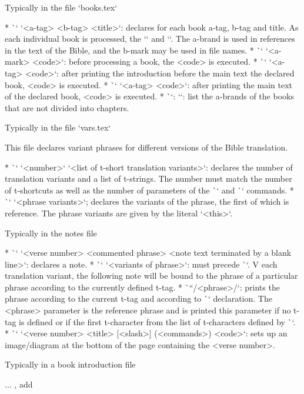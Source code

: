 {{{{{{{\secc Typically in the file `books.tex`

\begitems
* \`\BookTitle` `<a-tag> <b-tag> <title>`: declares for each book
  a-tag, b-tag and title. As each individual book is processed, the
  `\def\amark{<a-mark>}` and `\def\bmark{b-mark}`. The a-brand is used in
  references in the text of the Bible, and the b-mark may be used in file names.
* \`\BookException` `<a-mark> {<code>}`: before processing a book, the
  <code> is executed.
* \`\BookPre` `<a-tag> {<code>}`: after printing the introduction before the main text
  the declared book, <code> is executed.
* \`\BookPost` `<a-tag> {<code>}`: after printing the main text
  of the declared book, <code> is executed.
* \`\nochapbooks`: `\def\nochapbooks{<list>}`: list the a-brands of the books that
  are not divided into chapters.
\enditems

\secc Typically in the file `vars.tex`

This file declares variant phrases for different versions of the Bible translation.

\begitems
* \`\variants` `<number>` `<list of t-short translation variants>`: declares the number of
  translation variants and a list of \hbox{t-strings}. The number must match the number of
  t-shortcuts as well as the number of parameters of the \`\vdef` and \`\ww` commands.
* \`\vdef` `<phrase variants>`; declares the variants of the phrase, the first of which is
  reference. The phrase variants are given by the literal `{<this>}`.
\enditems

\secc Typically in the notes file

\begitems
* \`\Note` `<verse number> {<commented phrase>} <note text terminated by a blank line>`:
  declares a note.
* \`\ww` `<variants of phrase>`: must precede \`\Note`. V
  each translation variant, the following note will be bound to the phrase
  of a particular phrase according to the currently defined t-tag.
* \`\x``/<phrase>/`: prints the phrase according to the current t-tag and according to
  \`\vdef` declaration. The <phrase> parameter is the reference phrase and is printed
  this parameter if no t-tag is defined or if the first
  t-character from the list of t-characters defined by \`\variants`.
* \`\putBot` `<verse number> {<title>} [<slash>] (<commands>) {<code>}`:
  sets up an image/diagram at the bottom of the page containing the <verse number>.
\enditems

\secc Typically in a book introduction file

... \TODO, add

}}}}}}}
